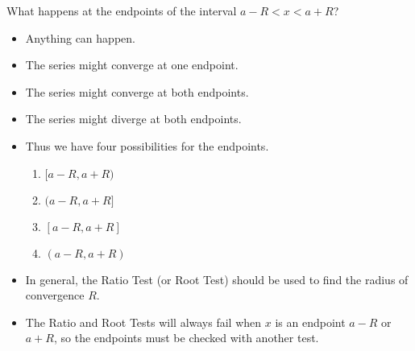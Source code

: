 \begin{frame}[t]
What happens at the endpoints of the interval $a - R < x < a + R$?
\begin{itemize}
\item<2->  Anything can happen.
\item<3-| alert@5>  The series might converge at one endpoint.
\item<3-| alert@6>  The series might converge at both endpoints.
\item<3-| alert@7>  The series might diverge at both endpoints.
\item<4->  Thus we have four possibilities for the endpoints.
\begin{enumerate}
\item<5-| alert@5>  $[a-R, a+R)$
\item<5-| alert@5>  $(a-R, a+R]$
\item<6-| alert@6>  $[a-R, a+R]$
\item<7-| alert@7>  $(a-R, a+R)$
\end{enumerate}
\item<8->  In general, the Ratio Test (or Root Test) should be used to find the radius of convergence $R$.
\item<9->  The Ratio and Root Tests will always fail when $x$ is an endpoint $a - R$ or $a + R$, so the endpoints must be checked with another test.
\end{itemize}
\end{frame}
